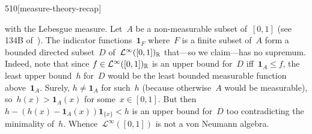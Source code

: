 \begin{parsec}{510}[measure-theory-recap]
\begin{point}{30}
with the Lebesgue measure.
Let~$A$ be a non-measurable
subset of~$[0,1]$ (see 134B of~\cite{fremlin}).
The indicator functions~$\mathbf{1}_F$
where~$F$ is a finite subset of~$A$
form a bounded directed subset~$D$ of~$\mathcal{L}^\infty([0,1])_{\mathbb{R}}$
that---so we claim---has no supremum.
Indeed, note that
since $f\in \mathcal{L}^\infty([0,1])_{\mathbb{R}}$
is an upper bound for~$D$ iff~$\mathbf{1}_A\leq f$,
the least upper bound~$h$ for~$D$
would be the least bounded measurable function above~$\mathbf{1}_A$.
Surely, $h\neq \mathbf{1}_A$
for such~$h$
(because otherwise~$A$ would be measurable),
so~$h(x)>\mathbf{1}_A(x)$ for some~$x\in [0,1]$.
But then $h - (h(x)-\mathbf{1}_A(x))\mathbf{1}_{\{x\}}<h$
is an upper bound for~$D$ too
contradicting the minimality of~$h$.
Whence~$\mathcal{L}^\infty([0,1])$
is not a von Neumann algebra.


\end{point}
\end{parsec}
